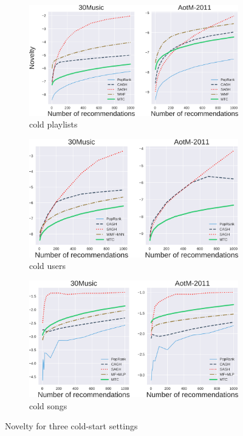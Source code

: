 \begin{figure}[!t]
    \centering
    \begin{subfigure}[t]{\columnwidth}
        \centering
        \includegraphics[width=\columnwidth]{fig/nov3.png}
        \caption{cold playlists}
    \end{subfigure}
    \begin{subfigure}[t]{\columnwidth}
        \centering
        \includegraphics[width=\columnwidth]{fig/nov4.png}
        \caption{cold users}
    \end{subfigure}
    \begin{subfigure}[t]{\columnwidth}
        \centering
        \includegraphics[width=\columnwidth]{fig/nov1.png}
        \caption{cold songs}
    \end{subfigure}
    \caption{Novelty for three cold-start settings}
\end{figure}

